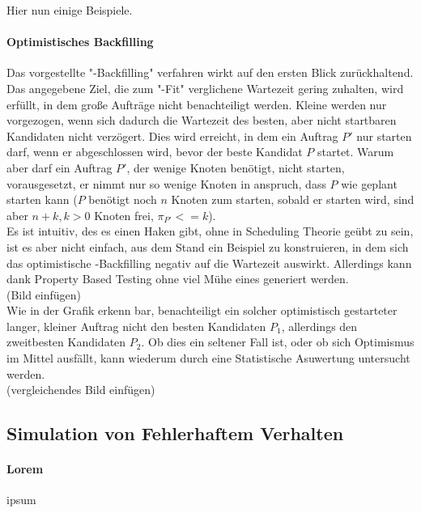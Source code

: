 Hier nun einige Beispiele.

\paragraph{Optimistisches Backfilling}
Das vorgestellte "-Backfilling" verfahren wirkt auf den ersten Blick zurückhaltend. Das angegebene Ziel, die zum "-Fit" verglichene Wartezeit gering zuhalten, wird erfüllt, in dem große Aufträge nicht benachteiligt werden. Kleine werden nur vorgezogen, wenn sich dadurch die Wartezeit des besten, aber nicht startbaren Kandidaten nicht verzögert. Dies wird erreicht, in dem ein Auftrag $P'$ nur starten darf, wenn er abgeschlossen wird, bevor der beste Kandidat $P$ startet. Warum aber darf ein Auftrag $P'$, der wenige Knoten benötigt, nicht starten, vorausgesetzt, er nimmt nur so wenige Knoten in anspruch, dass $P$ wie geplant starten kann ($P$ benötigt noch $n$ Knoten zum starten, sobald er starten wird, sind aber $n+k, k>0$ Knoten frei, $\pi_{P'} <= k$).\\
Es ist intuitiv, des es einen Haken gibt, ohne in Scheduling Theorie geübt zu sein, ist es aber nicht einfach, aus dem Stand ein Beispiel zu konstruieren, in dem sich das optimistische -Backfilling negativ auf die Wartezeit auswirkt. Allerdings kann dank Property Based Testing ohne viel Mühe eines generiert werden.
\\(Bild einfügen)
\\Wie in der Grafik erkenn bar, benachteiligt ein solcher optimistisch gestarteter langer, kleiner Auftrag nicht den besten Kandidaten $P_1$, allerdings den zweitbesten Kandidaten $P_2$. Ob dies ein seltener Fall ist, oder ob sich Optimismus im Mittel ausfällt, kann wiederum durch eine Statistische Asuwertung untersucht werden.
\\(vergleichendes Bild einfügen)

\subsection{Simulation von Fehlerhaftem Verhalten}

\paragraph{Lorem}
ipsum